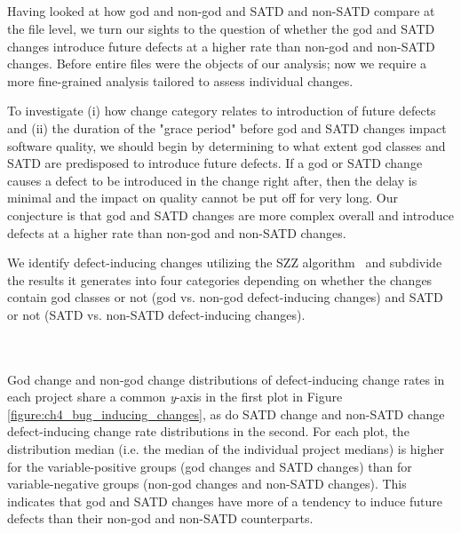 \subsection*{\chapterIVrqII}


Having looked at how god and non-god and SATD and non-SATD compare at the file level, we turn our sights to the question of whether the god and SATD changes introduce future defects at a higher rate than non-god and non-SATD changes. Before entire files were the objects of our analysis; now we require a more fine-grained analysis tailored to assess individual changes.


To investigate (i) how change category relates to introduction of future defects and (ii) the duration of the "grace period" before god and SATD changes impact software quality, we should begin by determining to what extent god classes and SATD are predisposed to introduce future defects. If a god or SATD change causes a defect to be introduced in the change right after, then the delay is minimal and the impact on quality cannot be put off for very long. Our conjecture is that god and SATD changes are more complex overall and introduce defects at a higher rate than non-god and non-SATD changes.


We identify defect-inducing changes utilizing the SZZ algorithm~\cite{sliwerski-msr-2005} and subdivide the results it generates into four categories depending on whether the changes contain god classes or not (god vs. non-god defect-inducing changes) and SATD or not (SATD vs. non-SATD defect-inducing changes).\\ \\ \\



God change and non-god change distributions of defect-inducing change rates in each project share a common \textit{y}-axis in the first plot in Figure \ref{figure:ch4_bug_inducing_changes}, as do SATD change and non-SATD change defect-inducing change rate distributions in the second. For each plot, the distribution median (i.e. the median of the individual project medians) is higher for the variable-positive groups (god changes and SATD changes) than for variable-negative groups (non-god changes and non-SATD changes). This indicates that god and SATD changes have more of a tendency to induce future defects than their non-god and non-SATD counterparts.

